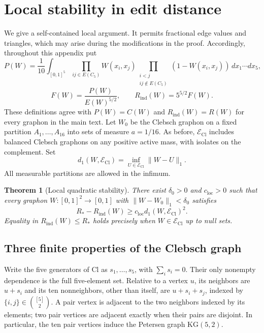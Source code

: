 \documentclass[11pt]{amsart}
\newtheorem{theorem}{Theorem}[section]
\theoremstyle{definition}
\theoremstyle{remark}
\begin{document}


\appendix
\section{Local stability in edit distance}\label{app:local-stability}

We give a self-contained local argument. It permits fractional edge
values and triangles, which may arise during the modifications in the
proof. Accordingly, throughout this appendix put
\[
 P(W)=\frac1{10}\int_{[0,1]^5}
       \prod_{ij\in E(C_5)}W(x_i,x_j)
       \prod_{\substack{i<j\\ij\notin E(C_5)}}(1-W(x_i,x_j))
       \,dx_1\cdots dx_5,
\]
\[
 F(W)=\frac{P(W)}{E(W)^{5/2}},\qquad
 R_{\mathrm{ind}}(W)=5^{5/2}F(W).
\]
These definitions agree with $P(W)=C(W)$ and $R_{\mathrm{ind}}(W)=R(W)$
for every graphon in the main text. Let $W_0$ be the Clebsch graphon on
a fixed partition $A_1,\ldots,A_{16}$ into sets of measure $a=1/16$.
As before, $\mathcal E_{\mathrm{Cl}}$ includes balanced Clebsch graphons
on any positive active mass, with isolates on the complement. Set
\[
 d_1(W,\mathcal E_{\mathrm{Cl}})
   =\inf_{U\in\mathcal E_{\mathrm{Cl}}}\lVert W-U\rVert_1.
\]
All measurable partitions are allowed in the infimum.

\begin{theorem}[Local quadratic stability]\label{thm:local-stability}
There exist $\delta_0>0$ and $c_{\mathrm{loc}}>0$ such that every graphon
$W:[0,1]^2\to[0,1]$ with $\lVert W-W_0\rVert_1<\delta_0$ satisfies
\begin{equation}\tag{76}\label{eq:local-stability}
 R_\ast-R_{\mathrm{ind}}(W)
   \geq c_{\mathrm{loc}}d_1(W,\mathcal E_{\mathrm{Cl}})^2.
\end{equation}
Equality in $R_{\mathrm{ind}}(W)\leq R_\ast$ holds precisely when
$W\in\mathcal E_{\mathrm{Cl}}$ up to null sets.
\end{theorem}

\subsection{Three finite properties of the Clebsch graph}

Write the five generators of $\mathrm{Cl}$ as $s_1,\ldots,s_5$, with
$\sum_i s_i=0$. Their only nonempty dependence is the full five-element
set. Relative to a vertex $u$, its neighbors are $u+s_i$ and its ten
nonneighbors, other than itself, are $u+s_i+s_j$, indexed by
$\{i,j\}\in\binom{[5]}{2}$. A pair vertex is adjacent to the two
neighbors indexed by its elements; two pair vertices are adjacent
exactly when their pairs are disjoint. In particular, the ten pair
vertices induce the Petersen graph $\mathrm{KG}(5,2)$.
\end{document}
